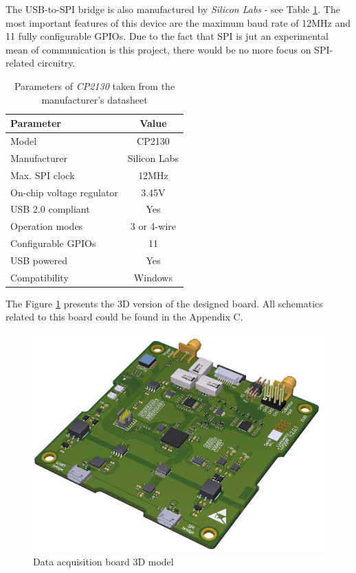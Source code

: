 \documentclass[12pt,a4paper]{article}
\begin{document}
The USB-to-SPI bridge is also manufactured by \textit{Silicon Labs} - see Table \ref{tab:cp2130_params}. The  most important features of this device are the maximum baud rate of 12MHz and 11 fully configurable GPIOs. Due to the fact that SPI is jut an experimental mean of communication is this project, there would be no more focus on SPI-related circuitry.

\begin{table}[ht!]
\begin{tabular}{|l|c|}
\hline
\textbf{Parameter}	& \textbf{Value} 	\\ \hline
Model  				& CP2130       \\ \hline
Manufacturer    	& Silicon Labs	\\ \hline
Max. SPI clock       	&  12MHz 		\\ \hline
On-chip voltage regulator     &  3.45V			\\ \hline
USB 2.0 compliant        &  Yes			\\ \hline
Operation modes        &  3 or 4-wire			\\ \hline
Configurable GPIOs 		&  11		\\ \hline
USB powered 	&  Yes 		\\ \hline
Compatibility 	&  Windows 		\\ \hline
\end{tabular}
\caption{Parameters of \textit{CP2130} taken from the manufacturer's datasheet \cite{cp2130_params}}
\label{tab:cp2130_params}
\end{table}

The Figure \ref{fig:logger3d} presents the 3D version of the designed board. All schematics related to this board could be found in the Appendix C.

\begin{figure}[ht!]
\includegraphics[scale=0.9]{logger.png}
\caption{Data acquisition board 3D model}
\label{fig:logger3d}
\end{figure}
\end{document}
